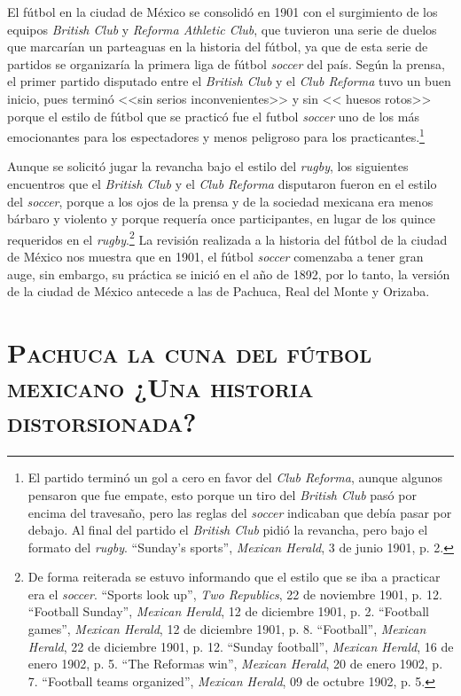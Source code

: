 \documentclass[11pt,a5paper,twoside]{book} %
\begin{document}
El fútbol en la ciudad de México se consolidó en 1901 con el surgimiento de los
equipos \emph{British Club} y \emph{Reforma Athletic Club}, que tuvieron una serie de duelos que marcarían
un parteaguas en la historia del fútbol, ya que de esta serie de partidos se organizaría la
primera liga de fútbol \emph{soccer} del país. Según la prensa, el primer partido disputado entre el \emph{British Club} y el \emph{Club Reforma} tuvo un buen inicio, pues terminó <<sin serios inconvenientes>> y sin << huesos rotos>> porque el estilo de fútbol que se practicó fue el futbol \emph{soccer} uno de los más emocionantes para los espectadores y menos peligroso para los practicantes.\footnote{El partido terminó un gol a cero en favor del \emph{Club Reforma}, aunque algunos pensaron que fue empate, esto porque un tiro del \emph{British Club} pasó por encima del travesaño, pero las reglas del \emph{soccer} indicaban que debía pasar por debajo. Al final del partido el \emph{British Club} pidió la revancha, pero bajo el formato del \emph{rugby}. ``Sunday’s sports'', \emph{Mexican Herald}, 3 de junio 1901, p. 2.}

Aunque se solicitó jugar la revancha bajo el estilo del \emph{rugby}, los siguientes encuentros
que el \emph{British Club} y el \emph{Club Reforma} disputaron fueron en el estilo del \emph{soccer}, porque a los ojos de la prensa y de la sociedad mexicana era menos bárbaro y violento y porque requería once participantes, en lugar de los quince requeridos en el \emph{rugby}.\footnote{De forma reiterada se estuvo informando que el estilo que se iba a practicar era el \emph{soccer}. ``Sports look up'', \emph{Two Republics}, 22 de noviembre 1901, p. 12. ``Football Sunday'', \emph{Mexican Herald}, 12 de diciembre 1901, p. 2. ``Football games'', \emph{Mexican Herald}, 12 de diciembre 1901, p. 8. ``Football'', \emph{Mexican Herald}, 22 de diciembre 1901, p. 12. ``Sunday football'', \emph{Mexican Herald}, 16 de enero 1902, p. 5. ``The Reformas win'', \emph{Mexican Herald}, 20 de enero 1902, p. 7. ``Football teams organized'', \emph{Mexican Herald}, 09 de octubre 1902, p. 5.} La revisión realizada a la historia del fútbol de la ciudad de México nos muestra que en 1901, el fútbol \emph{soccer} comenzaba a tener gran auge, sin embargo, su práctica se inició en el año de 1892, por lo
tanto, la versión de la ciudad de México antecede a las de Pachuca, Real del Monte y Orizaba.

\section*{\mdseries\large\textsc{Pachuca la cuna del fútbol mexicano ¿Una historia distorsionada?}}
\end{document}
